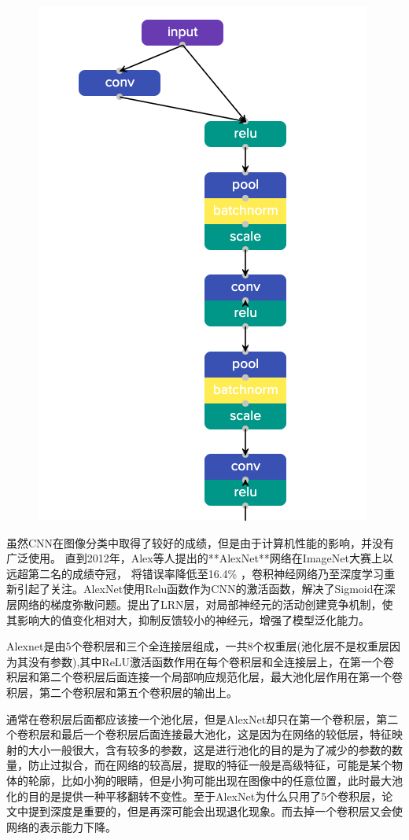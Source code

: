 \documentclass{progbookcn}
\begin{document}
\begin{figure}


\includegraphics[scale = 0.5]{alexnet.png}

\end{figure}

虽然CNN在图像分类中取得了较好的成绩，但是由于计算机性能的影响，并没有广泛使用。 直到2012年，Alex等人提出的**AlexNet**网络在ImageNet大赛上以远超第二名的成绩夺冠， 将错误率降低至16.4\% ，卷积神经网络乃至深度学习重新引起了关注。AlexNet使用Relu函数作为CNN的激活函数，解决了Sigmoid在深层网络的梯度弥散问题。提出了LRN层，对局部神经元的活动创建竞争机制，使其影响大的值变化相对大，抑制反馈较小的神经元，增强了模型泛化能力。

Alexnet是由5个卷积层和三个全连接层组成，一共8个权重层(池化层不是权重层因为其没有参数),其中ReLU激活函数作用在每个卷积层和全连接层上，在第一个卷积层和第二个卷积层后面连接一个局部响应规范化层，最大池化层作用在第一个卷积层，第二个卷积层和第五个卷积层的输出上。

​通常在卷积层后面都应该接一个池化层，但是AlexNet却只在第一个卷积层，第二个卷积层和最后一个卷积层后面连接最大池化，这是因为在网络的较低层，特征映射的大小一般很大，含有较多的参数，这是进行池化的目的是为了减少的参数的数量，防止过拟合，而在网络的较高层，提取的特征一般是高级特征，可能是某个物体的轮廓，比如小狗的眼睛，但是小狗可能出现在图像中的任意位置，此时最大池化的目的是提供一种平移翻转不变性。至于AlexNet为什么只用了5个卷积层，论文中提到深度是重要的，但是再深可能会出现退化现象。而去掉一个卷积层又会使网络的表示能力下降。
\end{document}
